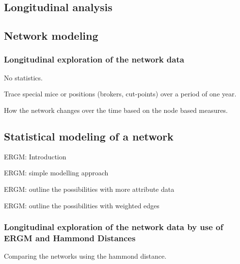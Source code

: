 \subsection{Longitudinal analysis}
\label{subsec:longitudinal_analysis}




\subsection{Network modeling}
\label{subsec:network_modeling}

\subsubsection{Longitudinal exploration of the network data}
\label{subsec:longitudinal}
No statistics.

\begin{mylist}
\item Trace special mice or positions (brokers, cut-points) over a period of one year.
\item How the network changes over the time based on the node based measures.
\end{mylist} 

\subsection{Statistical modeling of a network}
\label{subsec:exploratory}

\begin{mylist}
\item ERGM: Introduction
\item ERGM: simple modelling approach
\item ERGM: outline the possibilities with more attribute data
\item ERGM: outline the possibilities with weighted edges
\end{mylist}

\subsubsection{Longitudinal exploration of the network data by use of ERGM and Hammond Distances}

Comparing the networks using the hammond distance.
